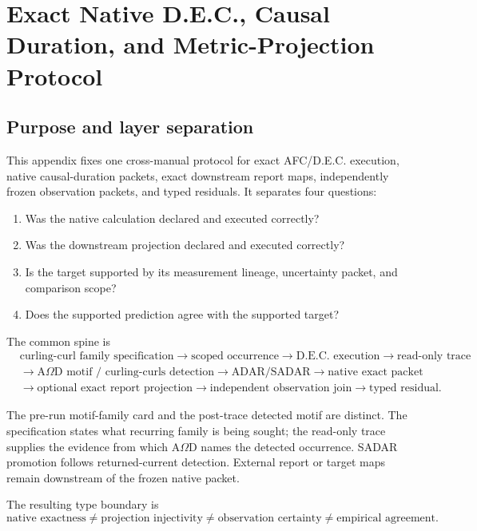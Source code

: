 \section{Exact Native D.E.C., Causal Duration, and Metric-Projection Protocol}
\label{app:shared-native-exactness-protocol}

\subsection{Purpose and layer separation}

This appendix fixes one cross-manual protocol for exact AFC/D.E.C. execution, native causal-duration packets, exact downstream report maps, independently frozen observation packets, and typed residuals.  It separates four questions:
\begin{enumerate}[leftmargin=2em]
  \item Was the native calculation declared and executed correctly?
  \item Was the downstream projection declared and executed correctly?
  \item Is the target supported by its measurement lineage, uncertainty packet, and comparison scope?
  \item Does the supported prediction agree with the supported target?
\end{enumerate}

The common spine is
\[
\boxed{
\begin{aligned}
&\text{curling-curl family specification}
\longrightarrow
\text{scoped occurrence}
\longrightarrow
\text{D.E.C. execution}
\longrightarrow
\text{read-only trace}
\\[-0.2em]
&\longrightarrow
\text{A$\Omega$D motif / curling-curls detection}
\longrightarrow
\text{ADAR/SADAR}
\longrightarrow
\text{native exact packet}
\\[-0.2em]
&\longrightarrow
\text{optional exact report projection}
\longrightarrow
\text{independent observation join}
\longrightarrow
\text{typed residual}.
\end{aligned}}
\]

The pre-run motif-family card and the post-trace detected motif are distinct.  The specification states what recurring family is being sought; the read-only trace supplies the evidence from which A$\Omega$D names the detected occurrence.  SADAR promotion follows returned-current detection.  External report or target maps remain downstream of the frozen native packet.

The resulting type boundary is
\[
\boxed{
\text{native exactness}
\neq
\text{projection injectivity}
\neq
\text{observation certainty}
\neq
\text{empirical agreement}.
}
\]

